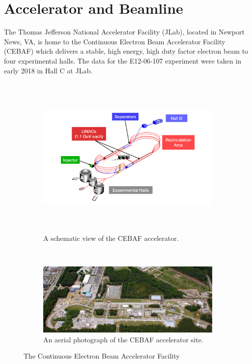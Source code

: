 \section{Accelerator and Beamline}
The Thomas Jefferson National Accelerator Facility (JLab), located in
Newport News, VA, is home to the Continuous Electron Beam Accelerator Facility
(CEBAF) which delivers a stable, high energy, high duty factor electron beam
to four experimental halls.
The data for the E12-06-107 experiment were taken in early 2018 in Hall C at
JLab.

\begin{figure}[ht]
    \centering
    \begin{subfigure}[b]{0.9\textwidth}
        \centering
        \includegraphics[height=8cm]{chap3/CEBAF.pdf}
        \caption{A schematic view of the CEBAF accelerator.}
        \label{fig:CEBAF_cartoon}
    \end{subfigure}
    \vspace{0.1cm}
    \\
    \begin{subfigure}[b]{0.9\textwidth}
        \centering
        \includegraphics[width=\textwidth]{chap3/CEBAF_aerial_horizontal.jpg}
        \caption{An aerial photograph of the CEBAF accelerator site.}
        \label{fig:CEBAF_aerial}
    \end{subfigure}
    \caption{The Continuous Electron Beam Accelerator Facility}
    \label{fig:CEBAF}
\end{figure}


